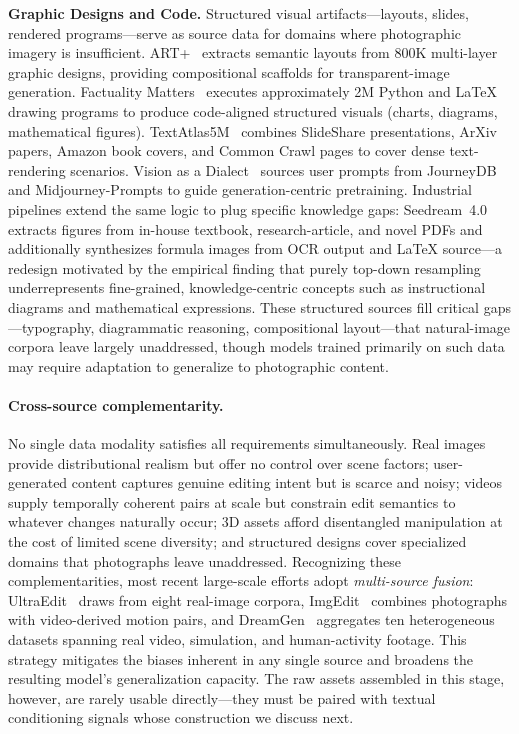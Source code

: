 \textbf{Graphic Designs and Code.}
Structured visual artifacts---layouts, slides, rendered programs---serve as source data for domains where photographic imagery is insufficient. ART+~\citep{pu2025art} extracts semantic layouts from 800K multi-layer graphic designs, providing compositional scaffolds for transparent-image generation. Factuality Matters~\citep{zhuo2025factuality} executes approximately 2M Python and \LaTeX{} drawing programs to produce code-aligned structured visuals (charts, diagrams, mathematical figures). TextAtlas5M~\citep{wang2025textatlas5m} combines SlideShare presentations, ArXiv papers, Amazon book covers, and Common Crawl pages to cover dense text-rendering scenarios. Vision as a Dialect~\citep{han2025vision} sources user prompts from JourneyDB~\citep{sun2023journeydb} and Midjourney-Prompts to guide generation-centric pretraining. Industrial pipelines extend the same logic to plug specific knowledge gaps: Seedream~4.0~\citep{seedream2025seedream} extracts figures from in-house textbook, research-article, and novel PDFs and additionally synthesizes formula images from OCR output and \LaTeX{} source---a redesign motivated by the empirical finding that purely top-down resampling underrepresents fine-grained, knowledge-centric concepts such as instructional diagrams and mathematical expressions. These structured sources fill critical gaps---typography, diagrammatic reasoning, compositional layout---that natural-image corpora leave largely unaddressed, though models trained primarily on such data may require adaptation to generalize to photographic content.

\paragraph{Cross-source complementarity.}
No single data modality satisfies all requirements simultaneously. Real images provide distributional realism but offer no control over scene factors; user-generated content captures genuine editing intent but is scarce and noisy; videos supply temporally coherent pairs at scale but constrain edit semantics to whatever changes naturally occur; 3D assets afford disentangled manipulation at the cost of limited scene diversity; and structured designs cover specialized domains that photographs leave unaddressed. Recognizing these complementarities, most recent large-scale efforts adopt \emph{multi-source fusion}: UltraEdit~\citep{zhao2024ultraedit} draws from eight real-image corpora, ImgEdit~\citep{ye2025imgedit} combines photographs with video-derived motion pairs, and DreamGen~\citep{jang2025dreamgen} aggregates ten heterogeneous datasets spanning real video, simulation, and human-activity footage. This strategy mitigates the biases inherent in any single source and broadens the resulting model's generalization capacity. The raw assets assembled in this stage, however, are rarely usable directly---they must be paired with textual conditioning signals whose construction we discuss next.

